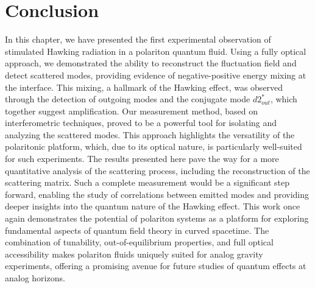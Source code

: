 \section{Conclusion}
\label{sec:conclusion}


In this chapter, we have presented the first experimental observation of stimulated Hawking radiation in a polariton quantum fluid. Using a fully optical approach, we demonstrated the ability to reconstruct the fluctuation field and detect scattered modes, providing evidence of negative-positive energy mixing at the interface.
 This mixing, a hallmark of the Hawking effect, was observed through the detection of outgoing modes and the conjugate mode \(d2_{out}^*\), which together suggest amplification.
Our measurement method, based on interferometric techniques, proved to be a powerful tool for isolating and analyzing the scattered modes. This approach highlights the versatility of the polaritonic platform, which, due to its optical nature, is particularly well-suited for such experiments. 
The results presented here pave the way for a more quantitative analysis of the scattering process, including the reconstruction of the scattering matrix. Such a complete measurement would be a significant step forward, enabling the study of correlations between emitted modes and providing deeper insights into the quantum nature of the Hawking effect.
This work once again demonstrates the potential of polariton systems as a platform for exploring fundamental aspects of quantum field theory in curved spacetime. The combination of tunability, out-of-equilibrium properties, and full optical accessibility makes polariton fluids uniquely suited for analog gravity experiments, offering a promising avenue for future studies of quantum effects at analog horizons.